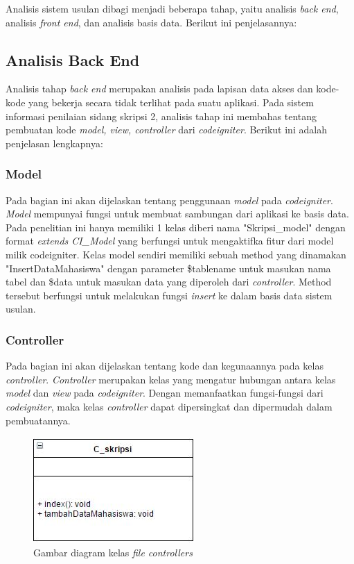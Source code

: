 Analisis sistem usulan dibagi menjadi beberapa tahap, yaitu analisis \textit{back end}, analisis \textit{front end}, dan analisis basis data. Berikut ini penjelasannya:
	
	\subsection{Analisis Back End}
	\label{sub: backEnd}
	
	Analisis tahap \textit{back end} merupakan analisis pada lapisan data akses dan kode-kode yang bekerja secara tidak terlihat pada suatu aplikasi. Pada sistem informasi penilaian sidang skripsi 2, analisis tahap ini membahas tentang pembuatan kode \textit{model, view, controller} dari \textit{codeigniter}. Berikut ini adalah penjelasan lengkapnya:
	
	\subsubsection{Model}
	\label{subsub: modelCI}
	
	Pada bagian ini akan dijelaskan tentang penggunaan \textit{model} pada \textit{codeigniter}. \textit{Model} mempunyai fungsi untuk membuat sambungan dari aplikasi ke basis data. Pada penelitian ini hanya memiliki 1 kelas diberi nama "Skripsi\_model" dengan format \textit{extends CI\_Model} yang berfungsi untuk mengaktifka fitur dari model milik codeigniter. Kelas model sendiri memiliki sebuah method yang dinamakan "InsertDataMahasiswa" dengan parameter \$tablename untuk masukan nama tabel dan \$data untuk masukan data yang diperoleh dari \textit{controller}. Method tersebut berfungsi untuk melakukan fungsi \textit{insert} ke dalam basis data sistem usulan.
	
	\subsubsection{Controller}
	\label{subsub: controllerCI}
	
	Pada bagian ini akan dijelaskan tentang kode dan kegunaannya pada kelas \textit{controller}. \textit{Controller} merupakan kelas yang mengatur hubungan antara kelas \textit{model} dan \textit{view} pada \textit{codeigniter}. Dengan memanfaatkan fungsi-fungsi dari \textit{codeigniter}, maka kelas \textit{controller} dapat dipersingkat dan dipermudah dalam pembuatannya.
	\begin{figure}[H]
		\centering
		\includegraphics[scale= 1.0]{Gambar/C_skripsi}
		\caption {Gambar diagram kelas \textit{file controllers}}
		\label{fig:controllers}
	\end{figure}

